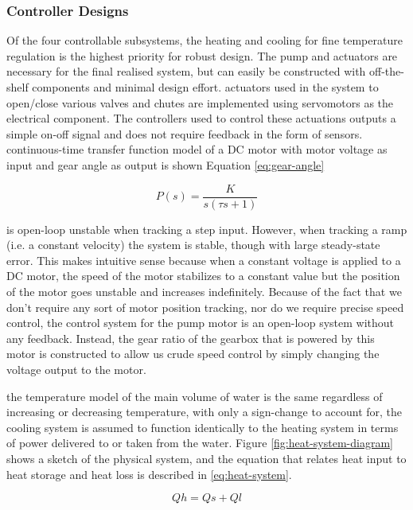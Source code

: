 \documentclass{article}
\begin{document}
\subsubsection{Controller Designs}
Of the four controllable subsystems, the heating and cooling for fine temperature regulation is the highest priority for robust design. The pump and actuators are necessary for the final realised system, but can easily be constructed with off-the-shelf components and minimal design effort.
 actuators used in the system to open/close various valves and chutes are implemented using servomotors as the electrical component. The controllers used to control these actuations outputs a simple on-off signal and does not require feedback in the form of sensors.
 continuous-time transfer function model of a DC motor with motor voltage as input and gear angle as output is shown Equation \ref{eq:gear-angle}

\begin{equation}
P(s) = \frac{K}{s(\tau s + 1)}
\label{eq:gear-angle}
\end{equation}

 is open-loop unstable when tracking a step input. However, when tracking a ramp (i.e. a constant velocity) the system is stable, though with large steady-state error. This makes intuitive sense because when a constant voltage is applied to a DC motor, the speed of the motor stabilizes to a constant value but the position of the motor goes unstable and increases indefinitely. Because of the fact that we don't require any sort of motor position tracking, nor do we require precise speed control, the control system for the pump motor is an open-loop system without any feedback. Instead, the gear ratio of the gearbox that is powered by this motor is constructed to allow us crude speed control by simply changing the voltage output to the motor.

 the temperature model of the main volume of water is the same regardless of increasing or decreasing temperature, with only a sign-change to account for, the cooling system is assumed to function identically to the heating system in terms of power delivered to or taken from the water. Figure \ref{fig:heat-system-diagram} shows a sketch of the physical system, and the equation that relates heat input to heat storage and heat loss is described in \ref{eq:heat-system}.

\begin{equation}
Qh = Qs + Ql
\label{eq:heat-system}
\end{equation}
\end{document}
